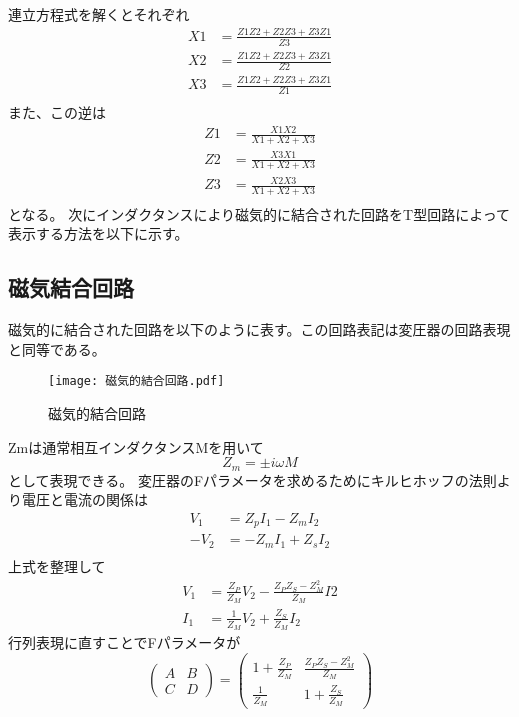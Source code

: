 連立方程式を解くとそれぞれ
\begin{eqnarray}
    X1 &= \frac{Z1Z2+Z2Z3+Z3Z1}{Z3}\\
    X2 &= \frac{Z1Z2+Z2Z3+Z3Z1}{Z2}\\
    X3 &= \frac{Z1Z2+Z2Z3+Z3Z1}{Z1}\\
\end{eqnarray}
また、この逆は
\begin{eqnarray}
    Z1 &= \frac{X1X2}{X1+X2+X3}\\
    Z2 &= \frac{X3X1}{X1+X2+X3}\\
    Z3 &= \frac{X2X3}{X1+X2+X3}\\
\end{eqnarray}
となる。
次にインダクタンスにより磁気的に結合された回路をT型回路によって表示する方法を以下に示す。
\subsection{磁気結合回路}
磁気的に結合された回路を以下のように表す。この回路表記は変圧器の回路表現と同等である。
\begin{figure}[H]
    \centering
    \texttt{[image: 磁気的結合回路.pdf]}
    \caption{磁気的結合回路}
\end{figure}
Zmは通常相互インダクタンスMを用いて
\begin{equation*}
    Z_m = \pm i\omega M
\end{equation*}
として表現できる。
変圧器のFパラメータを求めるためにキルヒホッフの法則より電圧と電流の関係は
\begin{eqnarray}
    V_1 &= Z_p I_1 -Z_m I_2\\
    -V_2 &= -Z_m I_1 + Z_s I_2\\
\end{eqnarray}
上式を整理して
\begin{eqnarray}
    V_1 &= \frac{Z_P}{Z_M}V_2 - \frac{Z_PZ_S-Z_M^2}{Z_M}I2\\
    I_1 &= \frac{1}{Z_M}V_2+\frac{Z_S}{Z_M}I_2
\end{eqnarray}
行列表現に直すことでFパラメータが
\begin{equation*}
    \begin{pmatrix}A&B\\C&D\end{pmatrix} =\begin{pmatrix}1+\frac{Z_P}{Z_M}&\frac{Z_PZ_S-Z_M^2}{Z_M}\\\frac{1}{Z_M}&1+\frac{Z_S}{Z_M}\end{pmatrix}
\end{equation*}
